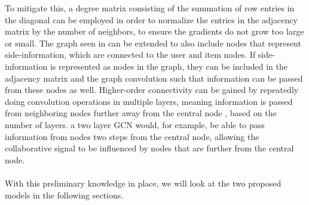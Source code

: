 To mitigate this, a degree matrix consisting of the summation of row entries in the diagonal can be employed in order to normalize the entries in the adjacency matrix by the number of neighbors, to ensure the gradients do not grow too large or small.
The graph seen in  can be extended to also include nodes that represent side-information, which are connected to the user and item nodes.
If side-information is represented as nodes in the graph, they can be included in the adjacency matrix and the graph convolution such that information can be passed from these nodes as well.
Higher-order connectivity can be gained by repeatedly doing convolution operations in multiple layers, meaning information is passed from neighboring nodes further away from the central node \cite{SimplifyingGCN, KOrderConnectivity}, based on the number of layers.
a two layer GCN would, for example, be able to pass information from nodes two steps from the central node, allowing the collaborative signal to be influenced by nodes that are further from the central node.\\\\
With this preliminary knowledge in place, we will look at the two proposed models in the following sections.
